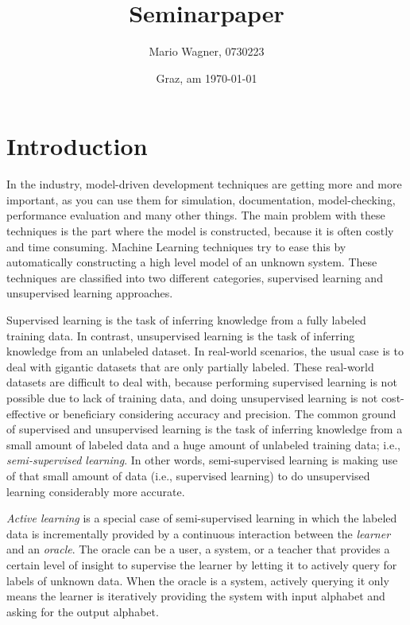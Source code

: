 \documentclass[
a4paper,
12pt
]{scrartcl}
\title{Seminarpaper}
\author{Mario Wagner, 0730223}
\date{Graz, am \today{}}
\newcommand\mw[1]{ [* {\textbf MW:} #1 *]}
\begin{document}
 \maketitle
 \tableofcontents
 \listoffigures
 \listoftables

\newpage





\section{Introduction}
In the industry, model-driven development techniques are getting more and more important, as you can use them for simulation, documentation, model-checking, performance evaluation and many other things. The main problem with these techniques is the part where the model is constructed, because it is often costly and time consuming. Machine Learning techniques try to ease this by automatically constructing a high level model of an unknown system. These techniques are classified into two different categories, supervised learning and unsupervised learning approaches.

\par Supervised learning is the task of inferring knowledge from a fully labeled training data. In contrast, unsupervised learning is the task of inferring knowledge from an unlabeled dataset. In real-world scenarios, the usual case is to deal with gigantic datasets that are only partially labeled. These real-world datasets are difficult to deal with, because performing supervised learning is not possible due to lack of training data, and doing unsupervised learning is not cost-effective or beneficiary considering accuracy and precision. The common ground of supervised and unsupervised learning is the task of inferring knowledge from a small amount of labeled data and a huge amount of unlabeled training data; i.e., \emph{semi-supervised learning}. In other words, semi-supervised learning is making use of that small amount of data (i.e., supervised learning) to do unsupervised learning considerably more accurate.

\par \emph{Active learning} is a special case of semi-supervised learning in which the labeled data is incrementally provided by a continuous interaction between the \emph{learner} and an \emph{oracle}. The oracle can be a user, a system, or a teacher that provides a certain level of insight to supervise the learner by letting it to actively query for labels of unknown data. When the oracle is a system, actively querying it only means the learner is iteratively providing the system with input alphabet and asking for the output alphabet.
\end{document}
